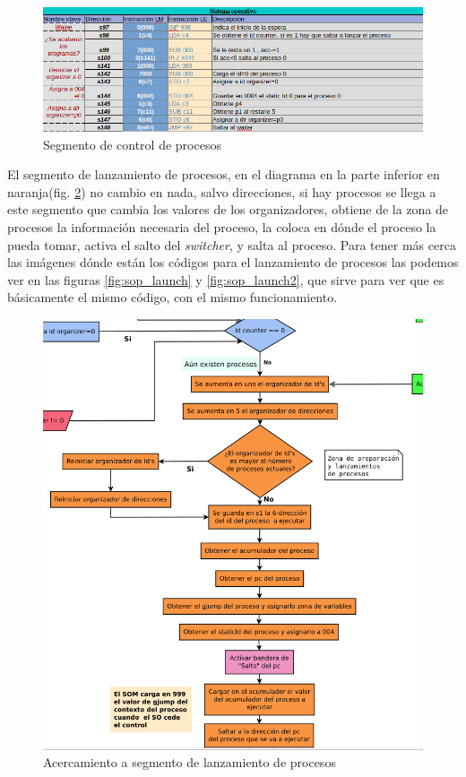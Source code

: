 \documentclass[letterpaper,12pt,oneside]{book}
\begin{document}
			
			\begin{figure}[h]		
				\centering
				\includegraphics[scale=0.53]{media/Paralela/somp_controlprocesos.png}
				\caption{Segmento de control de procesos}
				\label{fig:somp_controlprocesos}
			\end{figure}	
			
			
			El segmento de lanzamiento de procesos, en el diagrama en la parte inferior en naranja(fig. \ref{fig:diag_somp_launch_process}) no cambio en nada, 
			salvo direcciones, si hay procesos
			se llega a este segmento que cambia los valores de los organizadores, obtiene de la zona de procesos la información necesaria del proceso,
			la coloca en dónde el proceso la pueda tomar, activa el salto del \textit{switcher}, y salta al proceso. Para tener más cerca las imágenes
			dónde están los códigos para el lanzamiento de procesos las podemos ver en las figuras \ref{fig:sop_launch} y \ref{fig:sop_launch2}, que sirve
			para ver que es básicamente el mismo código, con el mismo funcionamiento.
			
		
			\begin{figure}[h]		
				\centering
				\includegraphics[scale=0.45]{media/Paralela/diag_somp_launch_process.png}
				\caption{Acercamiento a segmento de lanzamiento de procesos}
				\label{fig:diag_somp_launch_process}
			\end{figure}	
			
\end{document}
